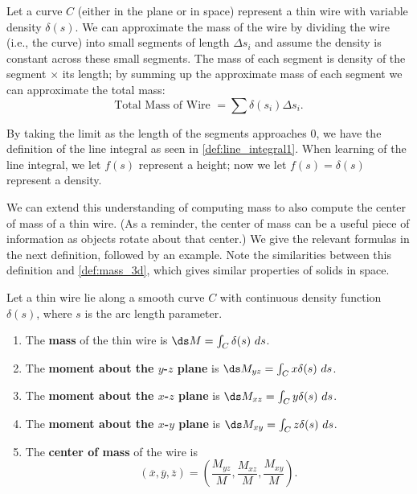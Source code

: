 Let a curve $C$ (either in the plane or in space) represent a thin wire with variable density $\delta(s)$. We can approximate the mass of the wire by dividing the wire (i.e., the curve) into small segments of length $\Delta s_i$ and assume the density is constant across these small segments. The mass of each segment is density of the segment $\times$ its length; by summing up the approximate mass of each segment we can approximate the total mass:
\[\text{Total Mass of Wire } = \sum \delta(s_i)\Delta s_i.\]

By taking the limit as the length of the segments approaches 0, we have the definition of the line integral as seen in \autoref{def:line_integral1}. When learning of the line integral, we let $f(s)$ represent a height; now we let $f(s) = \delta(s)$ represent a density.

We can extend this understanding of computing mass to also compute the center of mass of a thin wire. (As a reminder, the center of mass can be a useful piece of information as objects rotate about that center.) We give the relevant formulas in the next definition, followed by an example. Note the similarities between this definition and \autoref{def:mass_3d}, which gives similar properties of solids in space.

\begin{definition}\label{def:mass_of_thin_wire}
Let a thin wire lie along a smooth curve $C$ with continuous density function $\delta(s)$, where $s$ is the arc length parameter. 	%
\begin{enumerate}
	\item The \textbf{mass} of the thin wire is $\ds M = \int_C \delta(s)\ ds$.
	\item	The \textbf{moment about the $y$-$z$ plane} is $\ds M_{yz} = \int_C x\delta(s)\ ds$.
	
	\item	The \textbf{moment about the $x$-$z$ plane} is $\ds M_{xz} = \int_C y\delta(s)\ ds$.
	\item	The \textbf{moment about the $x$-$y$ plane} is $\ds M_{xy} = \int_C z\delta(s)\ ds$.
	\item The \textbf{center of mass} of the wire is
	\[
	(\overline{x},\overline{y},\overline{z})
	= \left(\frac{M_{yz}}M, \frac{M_{xz}}M,\frac{M_{xy}}M\right).
	\]
\end{enumerate}
\end{definition}


